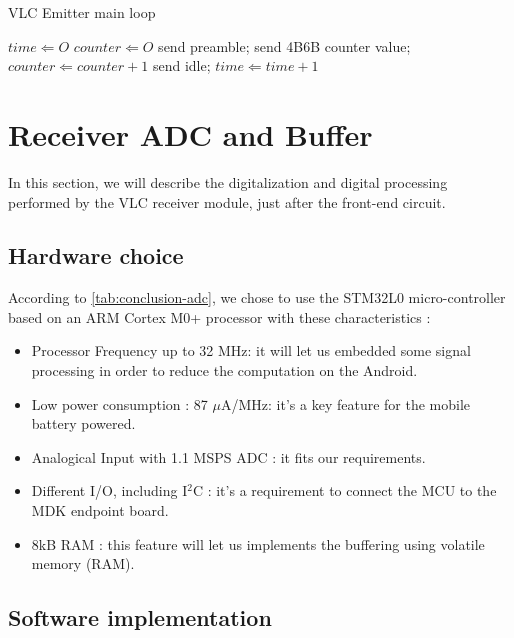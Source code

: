 \begin{algorithm}
\caption{VLC Emitter main loop}
\label{alg:emitter}
\begin{algorithmic}
    \State $time \Leftarrow O$
    \State $counter \Leftarrow O$
          \State send preamble;
          \State send 4B6B counter value;
          \State $counter \Leftarrow counter+1$
      \Else
          \State send idle;
    \EndIf
    \State $time \Leftarrow time+1$
    \EndWhile
\end{algorithmic}
\end{algorithm}


\section{Receiver ADC and Buffer}
In this section, we will describe the digitalization and digital processing performed by the VLC receiver module, just  after the front-end circuit.

\subsection{Hardware choice}

According to \ref{tab:conclusion-adc}, we chose to use the STM32L0 micro-controller based on an ARM Cortex  M0+ processor with these characteristics :
\begin{itemize}
\item Processor Frequency up to 32 MHz: it will let us embedded some signal processing in order to reduce the computation on the Android.
\item Low power consumption : 87 $\mu$A/MHz: it's a key feature for the mobile battery powered.
\item Analogical Input with 1.1 MSPS ADC : it fits our requirements.
\item Different I/O, including I$^2$C : it's a requirement to connect the MCU to the MDK endpoint board.
\item 8kB RAM : this feature will let us implements the buffering using volatile memory (RAM).
\end{itemize}

\subsection{Software implementation}

